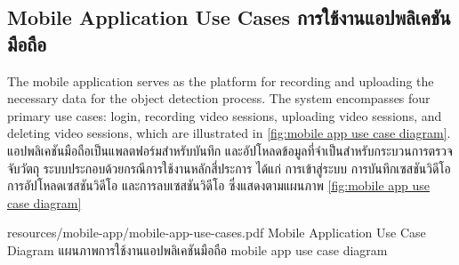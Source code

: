 \subsection{\ifenglish Mobile Application Use Cases \else การใช้งานแอปพลิเคชันมือถือ \fi}
\ifenglish
The mobile application serves as the platform for recording and uploading the necessary data for the object detection process. The system encompasses four primary use cases: login, recording video sessions, uploading video sessions, and deleting video sessions, which are illustrated in \ref{fig:mobile app use case diagram}.
\else
แอปพลิเคชันมือถือเป็นแพลตฟอร์มสำหรับบันทึก และอัปโหลดข้อมูลที่จำเป็นสำหรับกระบวนการตรวจจับวัตถุ ระบบประกอบด้วยกรณีการใช้งานหลักสี่ประการ ได้แก่ การเข้าสู่ระบบ การบันทึกเซสชันวิดีโอ การอัปโหลดเซสชันวิดีโอ และการลบเซสชันวิดีโอ ซึ่งแสดงตามแผนภาพ \ref{fig:mobile app use case diagram}
\fi

\insertPDFfigure
{resources/mobile-app/mobile-app-use-cases.pdf}
{\ifenglish Mobile Application Use Case Diagram \else แผนภาพการใช้งานแอปพลิเคชันมือถือ \fi}
{mobile app use case diagram}

